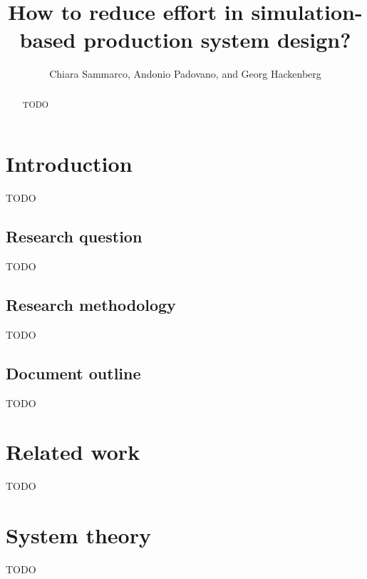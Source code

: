 \documentclass{article}
\begin{document}
    \title{How to reduce effort in simulation-based production system design?}
    \author{Chiara Sammarco, Andonio Padovano, and Georg Hackenberg}
    \maketitle

    \begin{abstract}
        TODO
    \end{abstract}
    
    \section{Introduction}
    \label{sec:intro}
    TODO~\cite{key}

    \subsection*{Research question}
    TODO

    \subsection*{Research methodology}
    TODO

    \subsection*{Document outline}
    TODO

    \section{Related work}
    \label{sec:related}
    TODO

    \section{System theory}
    \label{sec:theory}
    TODO
\end{document}
